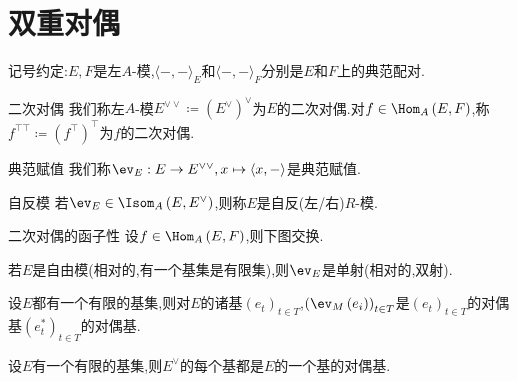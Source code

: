 \section{双重对偶}

记号约定:$E,F$是左$A$-模,$\langle -,-\rangle_{E}$和$\langle -,-\rangle_{F}$分别是$E$和$F$上的典范配对.

\begin{definition}{二次对偶}{}
	我们称左$A$-模$E^{\vee\vee}\coloneq\left(E^{\vee}\right)^{\vee}$为$E$的二次对偶.对$f\in\Hom_{A}\left(E,F\right)$,称$f^{\top\top}\coloneq\left(f^{\top}\right)^{\top}$为$f$的二次对偶.
\end{definition}

\begin{definition}{典范赋值}{}
	我们称$\ev_{E}:E\to E^{\vee\vee},x\mapsto\langle x,-\rangle$是典范赋值.
\end{definition}

\begin{definition}{自反模}{}
	若$\ev_{E}\in\Isom_{A}\left(E,E^{\vee}\right)$,则称$E$是自反(左/右)$R$-模.
\end{definition}

\begin{proposition}{二次对偶的函子性}{}
	设$f\in\Hom_{A}\left(E,F\right)$,则下图交换.
	\begin{center}
	\end{center}
\end{proposition}

\begin{proposition}{}{}
	若$E$是自由模(相对的,有一个基集是有限集),则$\ev_{E}$是单射(相对的,双射).
\end{proposition}

\begin{corollary}{}{}
	设$E$都有一个有限的基集,则对$E$的诸基$\left(e_{t}\right)_{t\in T}$,$\left(\ev_{M}\left(e_{i}\right)\right)_{t\in T}$是$\left(e_{t}\right)_{t\in T}$的对偶基$\left(e_{t}^{\ast}\right)_{t\in T}$的对偶基.
\end{corollary}

\begin{corollary}{}{}
	设$E$有一个有限的基集,则$E^{\vee}$的每个基都是$E$的一个基的对偶基.
\end{corollary}

